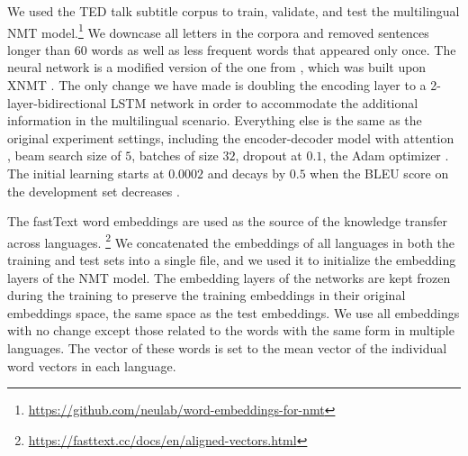 \documentclass[11pt,a4paper]{article}
\begin{document}
We used the TED talk subtitle corpus \citep{Qi:2018aa} to train, validate, and test the multilingual NMT model.\footnote{\url{https://github.com/neulab/word-embeddings-for-nmt}} 
We downcase all letters in the corpora and removed sentences longer than $60$ words as well as less frequent words that appeared only once.
The neural network is a modified version of the one from \citet{Qi:2018aa}, which was built upon XNMT \cite{Neubig:2018aa}. The only change we have made is doubling the encoding layer to a 2-layer-bidirectional LSTM network in order to accommodate the additional information in the multilingual scenario. Everything else is the same as the original experiment settings, including the encoder-decoder model with attention \cite{Bahdanau:2014aa}, beam search size of $5$, batches of size $32$, dropout at $0.1$, the Adam optimizer \cite{Kingma:2014aa}. The initial learning starts at $0.0002$ and decays by $0.5$ when the BLEU score on the development set decreases \cite{Denkowski:2017aa}.

The fastText word embeddings are used as the source of the knowledge transfer across languages.
\footnote{\url{https://fasttext.cc/docs/en/aligned-vectors.html}} 
We concatenated the embeddings of all languages in both the training and test sets into a single file, and we used it to initialize the embedding layers of the NMT model.
The embedding layers of the networks are kept frozen during the training to preserve the training embeddings in their original embeddings space, the same space as the test embeddings.  
We use all embeddings with no change except those related to the words with the same form in multiple languages.
The vector of these words is set to the mean vector of the individual word vectors in each language.  

\end{document}
